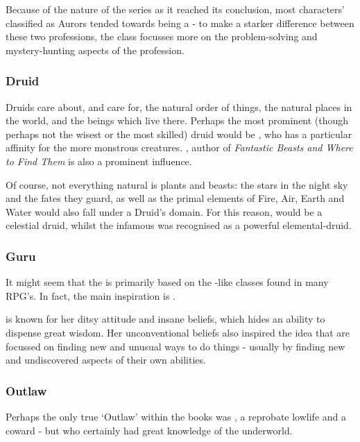 Because of the nature of the  series as it reached its conclusion, most characters' classified as Aurors tended towards being a  - to make a starker difference between these two professions, the  class focusses more on the problem-solving and mystery-hunting aspects of the  profession.

\subsubsection{Druid}

Druids care about, and care for, the natural order of things, the natural places in the world, and the beings which live there. Perhaps the most prominent (though perhaps not the wisest or the most skilled) druid would be , who has a particular affinity for the more monstrous creatures. , author of {\it Fantastic Beasts and Where to Find Them} is also a prominent influence. 

Of course, not everything natural is plants and beasts: the stars in the night sky and the fates they guard, as well as the primal elements of Fire, Air, Earth and Water would also fall under a Druid's domain. For this reason,  would be a celestial druid, whilst the infamous  was recognised as a powerful elemental-druid.

\subsubsection{Guru}

It might seem that the  is primarily based on the -like classes found in many RPG's. In fact, the main inspiration is . 

 is known for her ditsy attitude and insane beliefs, which hides an ability to dispense great wisdom. Her unconventional beliefs also inspired the idea that  are focussed on finding new and unusual ways to do things - usually by finding new and undiscovered aspects of their own abilities. 


\subsubsection{Outlaw}

Perhaps the only true `Outlaw' within the books was , a reprobate lowlife and a coward - but who certainly had great knowledge of the underworld. 

